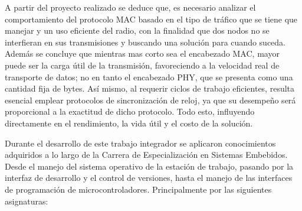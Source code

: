 A partir del proyecto realizado se deduce que, es necesario analizar el comportamiento del protocolo MAC basado en el tipo de tráfico que se tiene que manejar y un uso eficiente del radio, con la finalidad que dos nodos no se interfieran en sus transmisiones y buscando una solución para cuando suceda. Además se concluye que mientras mas corto sea el encabezado MAC, mayor puede ser la carga útil de la transmisión, favoreciendo a la velocidad real de transporte de datos; no en tanto el encabezado PHY, que se presenta como una cantidad fija de bytes. Así mismo, al requerir ciclos de trabajo eficientes, resulta esencial emplear protocolos de sincronización de reloj, ya que su desempeño será proporcional a la exactitud de dicho protocolo. Todo esto, influyendo directamente en el rendimiento, la vida útil y el costo de la solución.


\medskip
Durante el desarrollo de este trabajo integrador se aplicaron conocimientos adquiridos a lo largo de la Carrera de Especialización en Sistemas Embebidos. Desde el manejo del sistema operativo de la estación de trabajo, pasando por la interfaz de desarrollo y el control de versiones, hasta el manejo de las interfaces de programación de microcontroladores. Principalmente por las siguientes asignaturas: 

